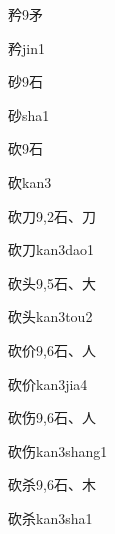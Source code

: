 \begin{Entry}{矜}{9}{⽭}
  \begin{Phonetics}{矜}{jin1}
  \end{Phonetics}
\end{Entry}

\begin{Entry}{砂}{9}{⽯}
  \begin{Phonetics}{砂}{sha1}
  \end{Phonetics}
\end{Entry}

\begin{Entry}{砍}{9}{⽯}
  \begin{Phonetics}{砍}{kan3}
  \end{Phonetics}
\end{Entry}

\begin{Entry}{砍刀}{9,2}{⽯、⼑}
  \begin{Phonetics}{砍刀}{kan3dao1}
  \end{Phonetics}
\end{Entry}

\begin{Entry}{砍头}{9,5}{⽯、⼤}
  \begin{Phonetics}{砍头}{kan3tou2}
  \end{Phonetics}
\end{Entry}

\begin{Entry}{砍价}{9,6}{⽯、⼈}
  \begin{Phonetics}{砍价}{kan3jia4}
  \end{Phonetics}
\end{Entry}

\begin{Entry}{砍伤}{9,6}{⽯、⼈}
  \begin{Phonetics}{砍伤}{kan3shang1}
  \end{Phonetics}
\end{Entry}

\begin{Entry}{砍杀}{9,6}{⽯、⽊}
  \begin{Phonetics}{砍杀}{kan3sha1}
  \end{Phonetics}
\end{Entry}

